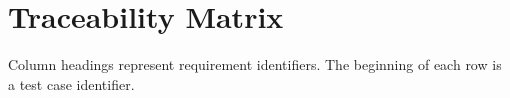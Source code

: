 \documentclass[titlepage]{article}
\begin{document}
\pagebreak
\section{Traceability Matrix%
  \label{Traceability Matrix}%
}

Column headings represent requirement identifiers. The beginning of each row is a test case identifier.
\vspace{5pt}

\begin{center}
\small\addtolength{\tabcolsep}{-3pt}
\begin{tabular}{ | c || c | c | c | c | c | c | c | c | c | c | c | c | c | c | c | c | c | c | c | c | c | c | c | c | c | c | c |}
\hline

\end{tabular}
\end{center}
\end{document}
